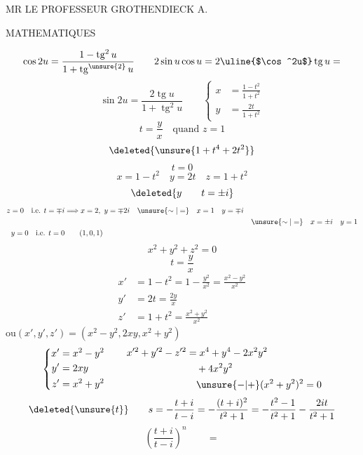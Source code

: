MR LE PROFESSEUR GROTHENDIECK A.

MATHEMATIQUES

\[
\cos 2u=\frac{1-\operatorname{tg}^{2}u}{1+\operatorname{tg}^{\unsure{2}}u}
\qquad 2\sin u\cos u=2\text{\uline{$\cos^2u$}}\operatorname{tg}u=
\]
\[
\sin 2u=\frac{2\operatorname{tg}u}{1+\operatorname{tg}^2u}
\qquad
\left\{\begin{aligned}x&=\frac{1-t^2}{1+t^2}\\y&=\frac{2t}{1+t^2}\end{aligned}\right.
\]
\[
t=\frac yx\quad\text{quand }z=1
\]
\[
\deleted{\unsure{1+t^4+2t^2}}
\]
\[
t=0
\]
\[
x=1-t^2\quad y=2t\quad z=1+t^2
\]
\[
\deleted{y\qquad t=\pm i}
\]
\[
\begin{aligned}
z=0\quad\text{i.e. }t=\mp i&\Longrightarrow x=2,\ y=\mp2i\quad
\unsure{\sim|=}\quad x=1\quad y=\mp i\\
&&\unsure{\sim|=}\quad x=\pm i\quad y=1\\
y=0\quad\text{i.e. }t=0&\qquad(1,0,1)
\end{aligned}
\]
\[
x^2+y^2+z^2=0
\]
\[
t=\frac yx
\]
\[
\begin{aligned}
x'&=1-t^2=1-\frac{y^2}{x^2}=\frac{x^2-y^2}{x^2}\\
y'&=2t=\frac{2y}{x}\\
z'&=1+t^2=\frac{x^2+y^2}{x^2}
\end{aligned}
\]
ou\quad $(x',y',z')=(x^2-y^2,2xy,x^2+y^2)$
\[
\left\{\begin{aligned}x'&=x^2-y^2\\y'&=2xy\\z'&=x^2+y^2\end{aligned}\right.
\qquad
\begin{aligned}
x'^2+y'^2-z'^2&=x^4+y^4-2x^2y^2\\
&\quad+4x^2y^2\\
&\quad\unsure{-|+}(x^2+y^2)^2=0
\end{aligned}
\]
\[
\deleted{\unsure{t}}\qquad
s=-\frac{t+i}{t-i}=-\frac{(t+i)^2}{t^2+1}
=-\frac{t^2-1}{t^2+1}-\frac{2it}{t^2+1}
\]
\[
\left(\frac{t+i}{t-i}\right)^n\qquad=
\]

